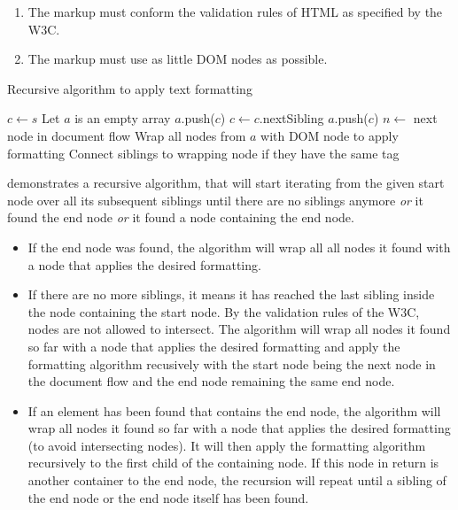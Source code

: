 \begin{enumerate}
\item The markup must conform the validation rules of HTML as specified by the W3C.
\item The markup must use as little DOM nodes as possible.
\end{enumerate}

\begin{algorithm}
\caption{Recursive algorithm to apply text formatting}
\label{alg:text_formatting}
\begin{algorithmic}[1]
    \State $c \gets s$
    \State Let $a$ is an empty array
      \State $a$.push($c$)
      \State $c \gets c$.nextSibling
     \EndWhile
      \State $a$.push($c$)
     \EndIf
      \State {}
     \EndIf
      \State $n \gets $ next node in document flow
      \State {}
     \EndIf
     \State Wrap all nodes from $a$ with DOM node to apply formatting
     \State Connect siblings to wrapping node if they have the same tag
  \EndProcedure
\end{algorithmic}
\end{algorithm}

 demonstrates a recursive algorithm, that will start iterating from the given start node over all its subsequent siblings until there are no siblings anymore \textit{or} it found the end node \textit{or} it found a node containing the end node.

\begin{itemize}

\item If the end node was found, the algorithm will wrap all all nodes it found with a node that applies the desired formatting.

\item If there are no more siblings, it means it has reached the last sibling inside the node containing the start node. By the validation rules of the W3C, nodes are not allowed to intersect. The algorithm will wrap all nodes it found so far with a node that applies the desired formatting and apply the formatting algorithm recusively with the start node being the next node in the document flow and the end node remaining the same end node.

\item If an element has been found that contains the end node, the algorithm will wrap all nodes it found so far with a node that applies the desired formatting (to avoid intersecting nodes). It will then apply the formatting algorithm recursively to the first child of the containing node. If this node in return is another container to the end node, the recursion will repeat until a sibling of the end node or the end node itself has been found.

\end{itemize}

